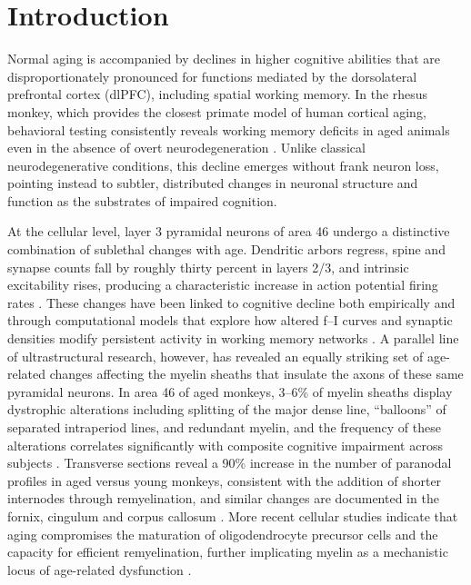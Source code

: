 
\section{Introduction}

Normal aging is accompanied by declines in higher cognitive abilities that are disproportionately pronounced for functions mediated by the dorsolateral prefrontal cortex (dlPFC), including spatial working memory. In the rhesus monkey, which provides the closest primate model of human cortical aging, behavioral testing consistently reveals working memory deficits in aged animals even in the absence of overt neurodegeneration \citep{chang2005firing,luebke2010area46}. Unlike classical neurodegenerative conditions, this decline emerges without frank neuron loss, pointing instead to subtler, distributed changes in neuronal structure and function as the substrates of impaired cognition.

At the cellular level, layer 3 pyramidal neurons of area 46 undergo a distinctive combination of sublethal changes with age. Dendritic arbors regress, spine and synapse counts fall by roughly thirty percent in layers 2/3, and intrinsic excitability rises, producing a characteristic increase in action potential firing rates \citep{peters2008synapses,chang2005firing,coskren2015aging,dickstein2013spines}. These changes have been linked to cognitive decline both empirically and through computational models that explore how altered f--I curves and synaptic densities modify persistent activity in working memory networks \citep{ibanez2020network}. A parallel line of ultrastructural research, however, has revealed an equally striking set of age-related changes affecting the myelin sheaths that insulate the axons of these same pyramidal neurons. In area 46 of aged monkeys, 3--6\% of myelin sheaths display dystrophic alterations including splitting of the major dense line, ``balloons'' of separated intraperiod lines, and redundant myelin, and the frequency of these alterations correlates significantly with composite cognitive impairment across subjects \citep{peters2002aging}. Transverse sections reveal a 90\% increase in the number of paranodal profiles in aged versus young monkeys, consistent with the addition of shorter internodes through remyelination, and similar changes are documented in the fornix, cingulum and corpus callosum \citep{peters2003remyelination,peters2010fornix,bowley2010cingulate}. More recent cellular studies indicate that aging compromises the maturation of oligodendrocyte precursor cells and the capacity for efficient remyelination, further implicating myelin as a mechanistic locus of age-related dysfunction \citep{dimovasili2022oligodendrocyte,go2020vesicles}.

